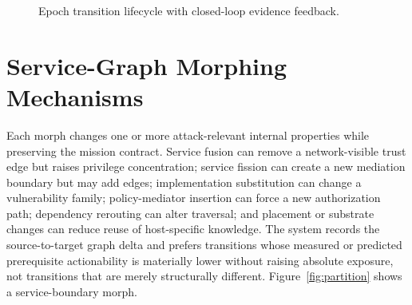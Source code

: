 \documentclass[11pt,letterpaper]{article}
\begin{document}
\begin{figure}[t]
\centering
{}
\caption{Epoch transition lifecycle with closed-loop evidence feedback.}
\label{fig:lifecycle}
\end{figure}

\section{Service-Graph Morphing Mechanisms}

Each morph changes one or more attack-relevant internal properties while preserving the mission contract. Service fusion can remove a network-visible trust edge but raises privilege concentration; service fission can create a new mediation boundary but may add edges; implementation substitution can change a vulnerability family; policy-mediator insertion can force a new authorization path; dependency rerouting can alter traversal; and placement or substrate changes can reduce reuse of host-specific knowledge. The system records the source-to-target graph delta and prefers transitions whose measured or predicted prerequisite actionability is materially lower without raising absolute exposure, not transitions that are merely structurally different. Figure~\ref{fig:partition} shows a service-boundary morph.
\end{document}
